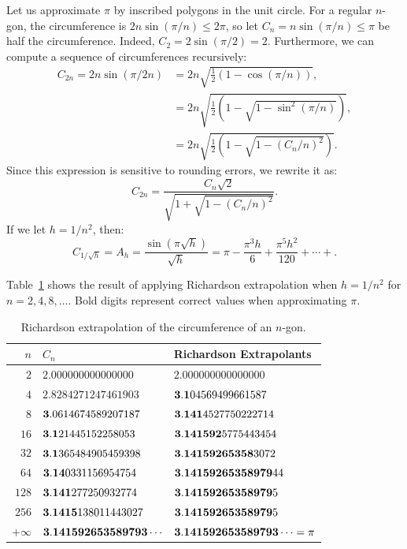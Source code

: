 \begin{example}
Let us approximate $\pi$ by inscribed polygons in the unit circle. For a regular $n$-gon, the circumference is $2n\sin(\pi/n) \le 2\pi$, so let $C_n = n\sin(\pi/n) \le \pi$ be half the circumference. Indeed, $C_2 = 2\sin(\pi/2) = 2$. Furthermore, we can compute a sequence of circumferences recursively:
\begin{align*}
C_{2n} = 2n\sin(\pi/2n) & = 2n\sqrt{\frac{1}{2}(1-\cos(\pi/n))},\\
& = 2n\sqrt{\frac{1}{2}\left(1-\sqrt{1-\sin^2(\pi/n)}\right)},\\
& = 2n\sqrt{\frac{1}{2}\left(1-\sqrt{1-(C_n/n)^2}\right)}.
\end{align*}
Since this expression is sensitive to rounding errors, we rewrite it as:
\[
C_{2n} = \dfrac{C_n\sqrt{2}}{\sqrt{1+\sqrt{1-(C_n/n)^2}}}.
\]
If we let $h = 1/n^2$, then:
\[
C_{1/\sqrt{h}} = A_h = \dfrac{\sin(\pi \sqrt{h})}{\sqrt{h}} = \pi - \dfrac{\pi^3h}{6} + \dfrac{\pi^5h^2}{120}+\cdots+.
\]

Table~\ref{table:Richardson1} shows the result of applying Richardson extrapolation when $h = 1/n^2$ for $n=2,4,8,\ldots.$ Bold digits represent correct values when approximating $\pi$.
\begin{table}[htp]
\caption{Richardson extrapolation of the circumference of an $n$-gon.}
\begin{center}
\begin{tabular}{rll}
\hline
$n$ & $C_n$ & Richardson Extrapolants\\
\hline
$2$ & $2.000000000000000$ & $2.000000000000000$\\
$4$ & $2.8284271247461903$ & ${\bf 3.1}04569499661587$\\
$8$ & ${\bf 3}.0614674589207187$ & ${\bf 3.141}4527750222714$\\
$16$ & ${\bf 3.1}21445152258053$ & ${\bf 3.141592}5775443454$\\
$32$ & ${\bf 3.1}365484905459398$ & ${\bf 3.14159265358}3072$\\
$64$ & ${\bf 3.14}0331156954754$ & ${\bf 3.14159265358979}44$\\
$128$ & ${\bf 3.141}277250932774$ & ${\bf 3.14159265358979}5$\\
$256$ & ${\bf 3.1415}138011443027$ & ${\bf 3.14159265358979}5$\\
\hline
$+\infty$ & ${\bf 3.141592653589793\cdots}$ & ${\bf 3.141592653589793\cdots} =\pi$\\
\hline
\end{tabular}
\end{center}
\label{table:Richardson1}
\end{table}%
\end{example}

